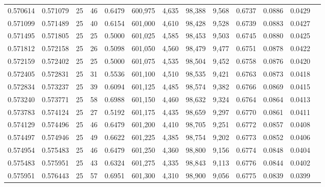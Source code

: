 \begin{tabular}{rrrrrrrrrrrrr}
0.570614 & 0.571079 &    25 &  46 &                                     0.6479 & 600,975 &   4,635 &  98,388 &   9,568 & 0.6737 & 0.0886 & 0.0429 \\
0.571099 & 0.571489 &    25 &  40 &                                     0.6154 & 601,000 &   4,610 &  98,428 &   9,528 & 0.6739 & 0.0883 & 0.0427 \\
0.571495 & 0.571805 &    25 &  25 &                                     0.5000 & 601,025 &   4,585 &  98,453 &   9,503 & 0.6745 & 0.0880 & 0.0425 \\
0.571812 & 0.572158 &    25 &  26 &                                     0.5098 & 601,050 &   4,560 &  98,479 &   9,477 & 0.6751 & 0.0878 & 0.0422 \\
0.572159 & 0.572402 &    25 &  25 &                                     0.5000 & 601,075 &   4,535 &  98,504 &   9,452 & 0.6758 & 0.0876 & 0.0420 \\
0.572405 & 0.572831 &    25 &  31 &                                     0.5536 & 601,100 &   4,510 &  98,535 &   9,421 & 0.6763 & 0.0873 & 0.0418 \\
0.572834 & 0.573237 &    25 &  39 &                                     0.6094 & 601,125 &   4,485 &  98,574 &   9,382 & 0.6766 & 0.0869 & 0.0415 \\
0.573240 & 0.573771 &    25 &  58 &                                     0.6988 & 601,150 &   4,460 &  98,632 &   9,324 & 0.6764 & 0.0864 & 0.0413 \\
0.573783 & 0.574124 &    25 &  27 &                                     0.5192 & 601,175 &   4,435 &  98,659 &   9,297 & 0.6770 & 0.0861 & 0.0411 \\
0.574129 & 0.574496 &    25 &  46 &                                     0.6479 & 601,200 &   4,410 &  98,705 &   9,251 & 0.6772 & 0.0857 & 0.0408 \\
0.574497 & 0.574946 &    25 &  49 &                                     0.6622 & 601,225 &   4,385 &  98,754 &   9,202 & 0.6773 & 0.0852 & 0.0406 \\
0.574954 & 0.575483 &    25 &  46 &                                     0.6479 & 601,250 &   4,360 &  98,800 &   9,156 & 0.6774 & 0.0848 & 0.0404 \\
0.575483 & 0.575951 &    25 &  43 &                                     0.6324 & 601,275 &   4,335 &  98,843 &   9,113 & 0.6776 & 0.0844 & 0.0402 \\
0.575951 & 0.576443 &    25 &  57 &                                     0.6951 & 601,300 &   4,310 &  98,900 &   9,056 & 0.6775 & 0.0839 & 0.0399 \\

\end{tabular}
